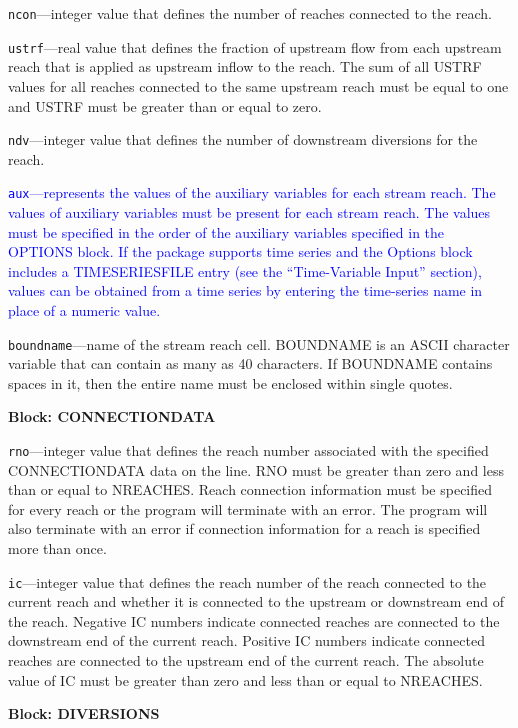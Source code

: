\begin{description}
\item \texttt{ncon}---integer value that defines the number of reaches connected to the reach.

\item \texttt{ustrf}---real value that defines the fraction of upstream flow from each upstream reach that is applied as upstream inflow to the reach. The sum of all USTRF values for all reaches connected to the same upstream reach must be equal to one and USTRF must be greater than or equal to zero.

\item \texttt{ndv}---integer value that defines the number of downstream diversions for the reach.

\item \textcolor{blue}{\texttt{aux}---represents the values of the auxiliary variables for each stream reach. The values of auxiliary variables must be present for each stream reach. The values must be specified in the order of the auxiliary variables specified in the OPTIONS block.  If the package supports time series and the Options block includes a TIMESERIESFILE entry (see the ``Time-Variable Input'' section), values can be obtained from a time series by entering the time-series name in place of a numeric value.}

\item \texttt{boundname}---name of the stream reach cell.  BOUNDNAME is an ASCII character variable that can contain as many as 40 characters.  If BOUNDNAME contains spaces in it, then the entire name must be enclosed within single quotes.

\end{description}
\item \textbf{Block: CONNECTIONDATA}

\begin{description}
\item \texttt{rno}---integer value that defines the reach number associated with the specified CONNECTIONDATA data on the line. RNO must be greater than zero and less than or equal to NREACHES. Reach connection information must be specified for every reach or the program will terminate with an error.  The program will also terminate with an error if connection information for a reach is specified more than once.

\item \texttt{ic}---integer value that defines the reach number of the reach connected to the current reach and whether it is connected to the upstream or downstream end of the reach. Negative IC numbers indicate connected reaches are connected to the downstream end of the current reach. Positive IC numbers indicate connected reaches are connected to the upstream end of the current reach. The absolute value of IC must be greater than zero and less than or equal to NREACHES.

\end{description}
\item \textbf{Block: DIVERSIONS}

